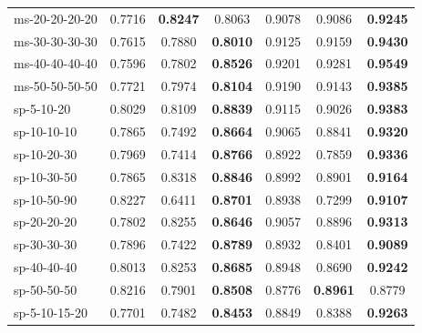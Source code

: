 \begin{table}[!t]
\begin{tabular}{lcccccc}
    ms-20-20-20-20 & 0.7716 & \textbf{0.8247} & 0.8063 & 0.9078 & 0.9086 & \textbf{0.9245} \\
    ms-30-30-30-30 & 0.7615 & 0.7880 & \textbf{0.8010} & 0.9125 & 0.9159 & \textbf{0.9430} \\
    ms-40-40-40-40 & 0.7596 & 0.7802 & \textbf{0.8526} & 0.9201 & 0.9281 & \textbf{0.9549} \\
    ms-50-50-50-50 & 0.7721 & 0.7974 & \textbf{0.8104} & 0.9190 & 0.9143 & \textbf{0.9385} \\
    \hline\hline
    sp-5-10-20 & 0.8029 & 0.8109 & \textbf{0.8839} & 0.9115 & 0.9026 & \textbf{0.9383} \\
    sp-10-10-10 & 0.7865 & 0.7492 & \textbf{0.8664} & 0.9065 & 0.8841 & \textbf{0.9320} \\
    sp-10-20-30 & 0.7969 & 0.7414 & \textbf{0.8766} & 0.8922 & 0.7859 & \textbf{0.9336} \\
    sp-10-30-50 & 0.7865 & 0.8318 & \textbf{0.8846} & 0.8992 & 0.8901 & \textbf{0.9164} \\
    sp-10-50-90 & 0.8227 & 0.6411 & \textbf{0.8701} & 0.8938 & 0.7299 & \textbf{0.9107} \\
    sp-20-20-20 & 0.7802 & 0.8255 & \textbf{0.8646} & 0.9057 & 0.8896 & \textbf{0.9313} \\
    sp-30-30-30 & 0.7896 & 0.7422 & \textbf{0.8789} & 0.8932 & 0.8401 & \textbf{0.9089} \\
    sp-40-40-40 & 0.8013 & 0.8253 & \textbf{0.8685} & 0.8948 & 0.8690 & \textbf{0.9242} \\
    sp-50-50-50 & 0.8216 & 0.7901 & \textbf{0.8508} & 0.8776 & \textbf{0.8961} & 0.8779 \\
    sp-5-10-15-20                 & 0.7701                           & 0.7482                           & \textbf{0.8453} & 0.8849                           & 0.8388                           & \textbf{0.9263} \\

\end{tabular}
\end{table}
